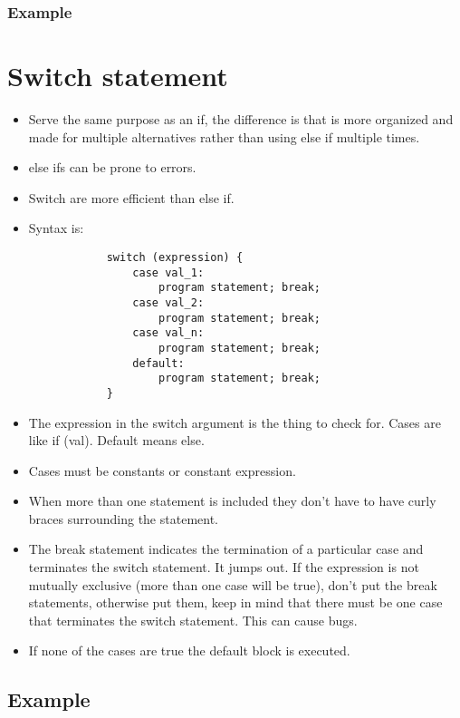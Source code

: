 \subsubsection{Example}


\section{Switch statement}
\begin{itemize}
    \item Serve the same purpose as an if, the difference is that is more organized and made for multiple alternatives rather than using else if multiple times. 
    \item else ifs can be prone to errors. 
    \item Switch are more efficient than else if. 
    \item Syntax is: 
        \begin{verbatim}
            switch (expression) {
                case val_1: 
                    program statement; break;
                case val_2: 
                    program statement; break;
                case val_n: 
                    program statement; break;
                default: 
                    program statement; break;
            }
        \end{verbatim}
    
    \item The expression in the switch argument is the thing to check for. Cases are like if (val). Default means else.
    \item Cases must be constants or constant expression. 
    \item  When more than one statement is included they don't have to have curly braces surrounding the statement. 
    \item The break statement indicates the termination of a particular case and terminates the switch statement. It jumps out. If the expression is not mutually exclusive (more than one case will be true), don't put the break statements, otherwise put them, keep in mind that there must be one case that terminates the switch statement. This can cause bugs. 
    \item If none of the cases are true the default block is executed. 
\end{itemize}
\subsection{Example}

